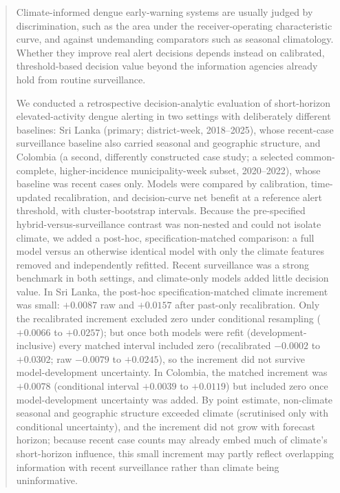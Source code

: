 \documentclass[11pt,a4paper]{article}
\begin{document}
\begin{abstract}
\noindent Climate-informed dengue early-warning systems are usually judged by discrimination, such as the area under the receiver-operating characteristic curve, and against undemanding comparators such as seasonal climatology. Whether they improve real alert decisions depends instead on calibrated, threshold-based decision value beyond the information agencies already hold from routine surveillance.

\noindent We conducted a retrospective decision-analytic evaluation of short-horizon elevated-activity dengue alerting in two settings with deliberately different baselines: Sri Lanka (primary; district-week, 2018--2025), whose recent-case surveillance baseline also carried seasonal and geographic structure, and Colombia (a second, differently constructed case study; a selected common-complete, higher-incidence municipality-week subset, 2020--2022), whose baseline was recent cases only. Models were compared by calibration, time-updated recalibration, and decision-curve net benefit at a reference alert threshold, with cluster-bootstrap intervals. Because the pre-specified hybrid-versus-surveillance contrast was non-nested and could not isolate climate, we added a post-hoc, specification-matched comparison: a full model versus an otherwise identical model with only the climate features removed and independently refitted. Recent surveillance was a strong benchmark in both settings, and climate-only models added little decision value. In Sri Lanka, the post-hoc specification-matched climate increment was small: $+0.0087$ raw and $+0.0157$ after past-only recalibration. Only the recalibrated increment excluded zero under conditional resampling ($+0.0066$ to $+0.0257$); but once both models were refit (development-inclusive) every matched interval included zero (recalibrated $-0.0002$ to $+0.0302$; raw $-0.0079$ to $+0.0245$), so the increment did not survive model-development uncertainty. In Colombia, the matched increment was $+0.0078$ (conditional interval $+0.0039$ to $+0.0119$) but included zero once model-development uncertainty was added. By point estimate, non-climate seasonal and geographic structure exceeded climate (scrutinised only with conditional uncertainty), and the increment did not grow with forecast horizon; because recent case counts may already embed much of climate's short-horizon influence, this small increment may partly reflect overlapping information with recent surveillance rather than climate being uninformative.


\end{abstract}
\end{document}
